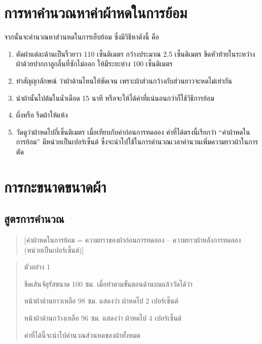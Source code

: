\section{การหาคำนวณหาค่าผ้าหดในการย้อม}

จากนั้นจะคำนวณหาส่วนหดในการเย็บย้อม ซึ่งมีวิธีหาดังนี้ คือ

\begin{enumerate}
\def\labelenumi{(\arabic{enumi})}
\item
  ตัดผ้าแต่ละด้านเป็นริ้วยาว 110 เซ็นติเมตร กว้างประมาณ 2.5 เซ็นติเมตร
  ขีดหัวท้ายในระหว่างผ้าด้วยปากกาลูกลื่นที่ซักไม่ออก ให้มีระยะห่าง 100 เซ็นติเมตร
\item
  ทำสัญญาลักษณ์ ว่าผ้าด้านไหนให้ชัดเจน เพราะผ้าส่วนกว้างกับส่วนยาวจะหดไม่เท่ากัน
\item
  นำผ้านั้นไปต้มในน้ำเดือด 15 นาที หรือจะให้ได้ค่าที่แน่นอนกว่าก็ใช้วิธีการย้อม
\item
  ผึ่งหรือ รีดผ้าให้แห้ง
\item
  วัดดูว่าผ้าหดไปกี่เซ็นติเมตร เมื่อเทียบกับค่าก่อนการทดลอง ค่าที่ได้ตรงนี้เรียกว่า
  ``ค่าผ้าหดในการย้อม'' มีหน่วยเป็นเปอร์เซ็นต์
  ซึ่งจะนำไปใช้ในการคำนวณเวลาคำนวนเพิ่มความยาวผ้าในการตัด
\end{enumerate}

\setlength{\nextPhotoWidth}{0.5\textwidth}



\clearpage

\section{การกะขนาดขนาดผ้า}

\subsection{สูตรการคำนวณ}

\begin{quote}
{[}ค่าผ้าหดในการย้อม = ความยาวของผ้าก่อนการทดลอง -- ความยาวผ้าหลังการทดลอง
(หน่วยเป็นเปอร์เซ็นต์){]}
\end{quote}

\begin{quote}
ตัวอย่าง 1

ขีดเส้นจัตุรัสขนาด 100 ซม. เมื่อทำตามขั้นตอนด้านบนแล้ววัดได้ว่า

หน้าผ้าด้านยาวเหลือ 98 ซม. แสดงว่า ผ้าหดไป 2 เปอร์เซ็นต์

หน้าผ้าด้านกว้างเหลือ 96 ซม. แสดงว่า ผ้าหดไป 4 เปอร์เซ็นต์

ค่าที่ได้นี้จะนำไปคำนวณส่วนหดของผ้าทั้งหมด
\end{quote}

